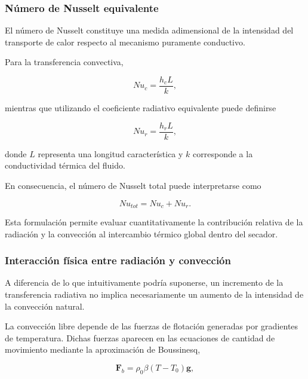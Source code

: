 \subsubsection{Número de Nusselt equivalente}

El número de Nusselt constituye una medida adimensional de la intensidad del transporte de calor respecto al mecanismo puramente conductivo.

Para la transferencia convectiva,

\begin{equation}
Nu_c=\frac{h_cL}{k},
\label{eq:nuc}
\end{equation}

mientras que utilizando el coeficiente radiativo equivalente puede definirse

\begin{equation}
Nu_r=\frac{h_rL}{k},
\label{eq:nur}
\end{equation}

donde $L$ representa una longitud característica y $k$ corresponde a la conductividad térmica del fluido.

En consecuencia, el número de Nusselt total puede interpretarse como

\begin{equation}
Nu_{tot}=Nu_c+Nu_r.
\label{eq:nutotal}
\end{equation}

Esta formulación permite evaluar cuantitativamente la contribución relativa de la radiación y la convección al intercambio térmico global dentro del secador.


\subsubsection{Interacción física entre radiación y convección}

A diferencia de lo que intuitivamente podría suponerse, un incremento de la transferencia radiativa no implica necesariamente un aumento de la intensidad de la convección natural.

La convección libre depende de las fuerzas de flotación generadas por gradientes de temperatura. Dichas fuerzas aparecen en las ecuaciones de cantidad de movimiento mediante la aproximación de Boussinesq,

\begin{equation}
\mathbf{F}_b
=
\rho_0\beta
(T-T_0)
\mathbf{g},
\end{equation}

